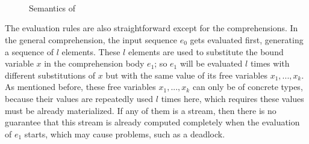 \begin{figure}\large

	\\[4ex]
	\PT{
		\Axiom{\Eval{\rho}{\{\}\tau}{\{\}}}
	}\\[4ex]
	\\[4ex]
	\\[4ex]
	
	\\[4ex]	
	\\[4ex]
	\\[4ex]
	\\
\caption{Semantics of \mysnesl \label{fig:mysnesl-semantics}}
\end{figure}

The evaluation rules are also straightforward except for the comprehensions.
In the general comprehension, the input sequence $e_0$ gets evaluated first, generating a sequence of $l$ elements.
These $l$ elements are used to substitute the bound variable $x$ in the comprehension body $e_1$; so $e_1$ will be evaluated $l$ times with different substitutions of $x$ but with the same value of its free variables $x_1,...,x_k$.
As mentioned before, these free variables $x_1,..., x_k$ can only be of concrete types, because their values are repeatedly used $l$ times here, which requires these values must be already materialized. 
If any of them is a stream, then there is no guarantee that this stream is already computed completely when the evaluation of $e_1$ starts, which may cause problems, such as a deadlock.

